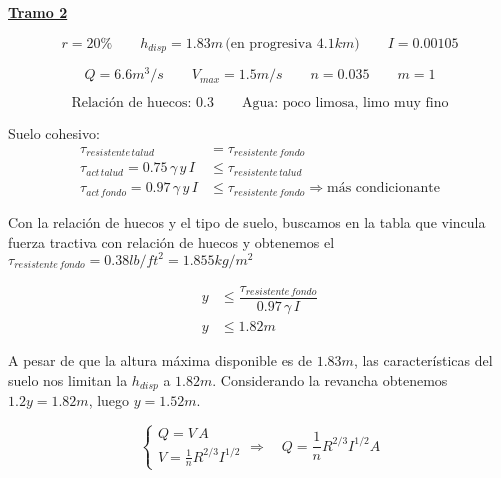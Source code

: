\underline{\bf Tramo 2}

\begin{equation*}
  r = 20\%
 \qquad
  h_{disp} = 1.83 m \,\text{(en progresiva }4.1 km \text{)}
 \qquad
  I = 0.00105
\end{equation*}

\begin{equation*}
  Q = 6.6 m^3/s
 \qquad
  V_{max} = 1.5 m/s
 \qquad
  n = 0.035
 \qquad
  m = 1
\end{equation*}

\begin{equation*}
  \text{Relación de huecos: 0.3}
  \qquad
  \text{Agua: poco limosa, limo muy fino}
\end{equation*}

Suelo cohesivo:
\begin{align*}
 \tau_{resistente\,talud} &= \tau_{resistente\,fondo} \\
 \tau_{act\,talud} = 0.75 \, \gamma \, y \, I &\leq \tau_{resistente\,talud} \\
 \tau_{act\,fondo} = 0.97 \, \gamma \, y \, I &\leq \tau_{resistente\,fondo} \Longrightarrow \text{más condicionante}
\end{align*}

Con la relación de huecos y el tipo de suelo, buscamos en la tabla que vincula fuerza tractiva con relación de huecos y obtenemos
el $\tau_{resistente\,fondo} = 0.38 lb/ft^2 = 1.855 kg/m^2$

\begin{align*}
 y &\leq \dfrac{\tau_{resistente\,fondo}}{0.97 \, \gamma \, I} \\
 y &\leq 1.82 m
\end{align*}

A pesar de que la altura máxima disponible es de $1.83 m$, las características del suelo nos limitan la $h_{disp}$ a $1.82 m$.
Considerando la revancha obtenemos $1.2 y = 1.82 m$, luego $y = 1.52 m$.

\begin{equation*}
  \begin{cases}
    Q = V \, A \\
    V =  \frac{1}{n} R^{2/3} I^{1/2}
  \end{cases}
  \Longrightarrow \quad
  Q = \frac{1}{n} R^{2/3} I^{1/2} A
\end{equation*}


